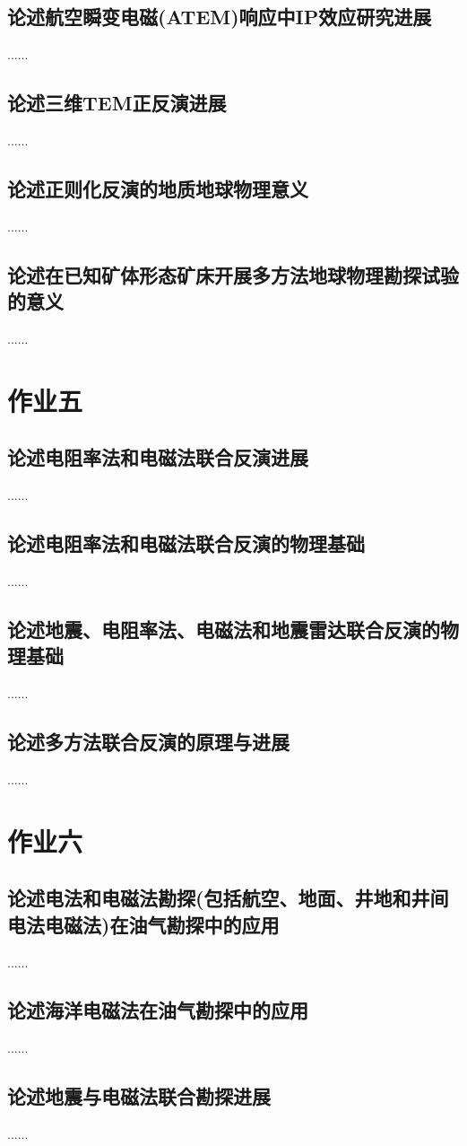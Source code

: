 \documentclass{coursework}
\begin{document}
	\subsection{论述航空瞬变电磁(ATEM)响应中IP效应研究进展}
	......
	\subsection{论述三维TEM正反演进展}
	......
	\subsection{论述正则化反演的地质地球物理意义}
	......
	\subsection{论述在已知矿体形态矿床开展多方法地球物理勘探试验的意义}
	......
	\section{作业五}
	\subsection{论述电阻率法和电磁法联合反演进展}
	......
	\subsection{论述电阻率法和电磁法联合反演的物理基础}
	......
	\subsection{论述地震、电阻率法、电磁法和地震雷达联合反演的物理基础}
	......
	\subsection{论述多方法联合反演的原理与进展}
	......
	\section{作业六}
	\subsection{论述电法和电磁法勘探(包括航空、地面、井地和井间电法电磁法)在油气勘探中的应用}
	......
	\subsection{论述海洋电磁法在油气勘探中的应用}
	......
	\subsection{论述地震与电磁法联合勘探进展}
	......
\end{document}

